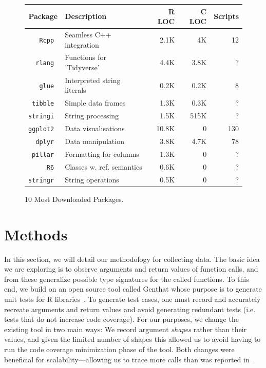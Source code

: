 \documentclass[acmsmall,10pt,review,anonymous]{acmart}\settopmatter{printfolios=true,printccs=false,printacmref=false}
\newcommand{\genthat}{{\sc Genthat}\xspace}
\begin{document}
\begin{figure}[!th]{\footnotesize\begin{tabular}{@{}r||l|r|r|r@{}}\hline
\bf Package & \bf Description & \bf R LOC &\bf C LOC &\bf Scripts\\\hline
\tt Rcpp  & Seamless C++ integration & 2.1K & 4K & 12 \\
\tt rlang & Functions for 'Tidyverse' & 4.4K & 3.8K & ? \\
\tt glue  & Interpreted string literals & 0.2K & 0.2K & 8 \\
\tt tibble & Simple data frames & 1.3K & 0.3K & ? \\
\tt stringi &  String processing & 1.5K & 515K & ? \\
\tt ggplot2 & Data visualisations & 10.8K & 0 & 130 \\
\tt dplyr  &  Data manipulation & 3.8K & 4.7K & 78 \\
\tt pillar & Formatting for columns & 1.3K & 0 & ? \\
\tt R6 & Classes w. ref. semantics & 0.6K & 0 & ? \\
\tt stringr & String operations & 0.5K & 0 & ? \\
\end{tabular}}\caption{10 Most Downloaded Packages.}\label{most}
\end{figure}

\newpage
\section{Methods}

In this section, we will detail our methodology for collecting data.  The
basic idea we are exploring is to observe arguments and return values of
function calls, and from these generalize possible type signatures for the
called functions. To this end, we build on an open source tool called
\genthat whose purpose is to generate unit tests for R
libraries~\cite{issta18}.  To generate test cases, one must record and
accurately recreate arguments and return values and avoid generating
redundant tests (i.e. tests that do not increase code coverage). For our
purposes, we change the existing tool in two main ways: We record argument
\emph{shapes} rather than their values, and given the limited number of shapes
this allowed us to avoid having to run the code coverage minimization phase of
the tool. Both changes were beneficial for scalability---allowing us to
trace more calls than was reported in~\cite{issta18}.
\end{document}
